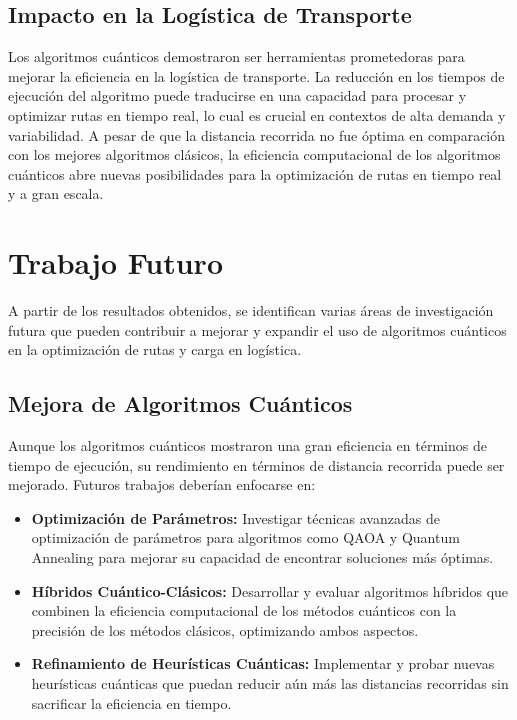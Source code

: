 \documentclass[11pt,a4paper,spanish]{book}
\begin{document}
\subsection{Impacto en la Logística de Transporte}

Los algoritmos cuánticos demostraron ser herramientas prometedoras para mejorar la eficiencia en la logística de transporte. La reducción en los tiempos de ejecución del algoritmo puede traducirse en una capacidad para procesar y optimizar rutas en tiempo real, lo cual es crucial en contextos de alta demanda y variabilidad. A pesar de que la distancia recorrida no fue óptima en comparación con los mejores algoritmos clásicos, la eficiencia computacional de los algoritmos cuánticos abre nuevas posibilidades para la optimización de rutas en tiempo real y a gran escala.

\section{Trabajo Futuro}

A partir de los resultados obtenidos, se identifican varias áreas de investigación futura que pueden contribuir a mejorar y expandir el uso de algoritmos cuánticos en la optimización de rutas y carga en logística.

\subsection{Mejora de Algoritmos Cuánticos}

Aunque los algoritmos cuánticos mostraron una gran eficiencia en términos de tiempo de ejecución, su rendimiento en términos de distancia recorrida puede ser mejorado. Futuros trabajos deberían enfocarse en:

\begin{itemize}
    \item \textbf{Optimización de Parámetros:} Investigar técnicas avanzadas de optimización de parámetros para algoritmos como QAOA y Quantum Annealing para mejorar su capacidad de encontrar soluciones más óptimas.
    \item \textbf{Híbridos Cuántico-Clásicos:} Desarrollar y evaluar algoritmos híbridos que combinen la eficiencia computacional de los métodos cuánticos con la precisión de los métodos clásicos, optimizando ambos aspectos.
    \item \textbf{Refinamiento de Heurísticas Cuánticas:} Implementar y probar nuevas heurísticas cuánticas que puedan reducir aún más las distancias recorridas sin sacrificar la eficiencia en tiempo.
\end{itemize}
\end{document}
